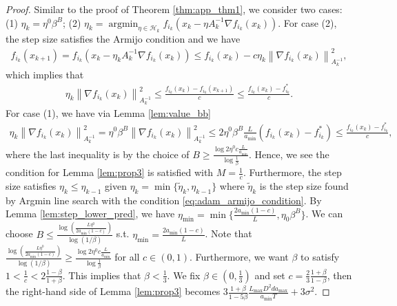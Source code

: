 \documentclass{article}
\newcommand{\norm}[1]{\left \lVert #1 \right \rVert}
\DeclareMathOperator{\argmin}{argmin}
\begin{document}
\begin{proof}
    Similar to the proof of Theorem \ref{thm:app_thm1}, we consider two cases: (1) $\eta_k = \eta^{0} \beta^B$; (2) $\eta_k = \argmin_{\eta \in \mathcal{H}_k} f_{i_k}(x_k - \eta A^{-1}_k \nabla f_{i_k}(x_k))$. 
    For case (2), the step size satisfies the Armijo condition and we have
    \begin{align*}
        f_{i_k} (x_{k+1}) = f_{i_k} (x_k - \eta_k A_k^{-1} \nabla f_{i_k}(x_k)) \leq  f_{i_k} (x_k) - c \eta_k \norm{\nabla f_{i_k} (x_k)}_{A_k^{-1}}^2, 
    \end{align*}
    which implies that
    \begin{align*}
        \eta_k \norm{\nabla f_{i_k}(x_k)}_{A_k^{-1}}^2 \leq \frac{f_{i_k} (x_k) - f_{i_k} (x_{k+1})}{c} \leq \frac{f_{i_k} (x_k) -f^*_{i_k}}{c}. 
    \end{align*}
    For case (1), we have via Lemma \ref{lem:value_bb}
    \begin{align*}
        \eta_k \norm{\nabla f_{i_k}(x_k)}_{A^{-1}_k}^2 = \eta^0 \beta^B \norm{\nabla f_{i_k}(x_k)}_{A^{-1}_k}^2 \leq 2 \eta^0 \beta^B \frac{L}{a_{\min}} (f_{i_k} (x_k) -f^*_{i_k}) \leq \frac{f_{i_k} (x_k) -f^*_{i_k}}{c},
    \end{align*}
    where the last inequality is by the choice of $B \geq \frac{\log 2 \eta^0 c \frac{L}{a_{\min}}}{\log \frac{1}{\beta}}$. Hence, we see the condition for Lemma \ref{lem:prop3} is satisfied with $M = \frac{1}{c}$. Furthermore, the step size satisfies $\eta_k \leq \eta_{k-1}$ given $\eta_k = \min \{ \tilde{\eta}_k, \eta_{k-1}\}$ where $\tilde{\eta}_k$ is the step size found by  Argmin line search with the condition \eqref{eq:adam_armijo_condition}. By Lemma \ref{lem:step_lower_pred}, we have $\eta_{\min} = \min\{ \frac{2 a_{\min} (1-c)}{L}, \eta_0 \beta^B\}$. We can choose $B \leq \frac{\log(\frac{L \eta^0}{2 a_{\min} (1-c)})}{\log(1/\beta)}$ s.t. $\eta_{\min} = \frac{2 a_{\min} (1-c)}{L}$. Note that $\frac{\log(\frac{L \eta^0}{2 a_{\min} (1-c)})}{\log(1/\beta)} \geq \frac{\log 2 \eta^0 c \frac{L}{a_{\min}}}{\log \frac{1}{\beta}}$ for all $c \in (0,1)$. Furthermore, we want $\beta$ to satisfy $1 < \frac{1}{c} < 2 \frac{1 - \beta}{1 + \beta}$. This implies that $\beta <\frac{1}{3}$. We fix $\beta \in (0,\frac{1}{3})$ and set $c = \frac{2}{3} \frac{1 + \beta}{1 - \beta}$, then the right-hand side of Lemma \ref{lem:prop3} becomes $3 \frac{1 + \beta}{1 - 5 \beta} \frac{L_{\max} D^2 d a_{\max}}{a_{\min} T} + 3 \sigma^2$. 

\end{proof}
\end{document}
